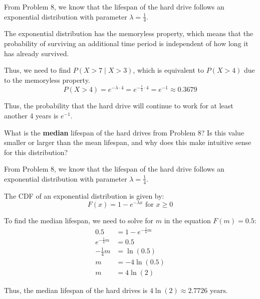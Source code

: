 \documentclass[a4paper, 10pt]{article}
\begin{document}
\begin{tosubmit}
	From Problem 8, we know that the lifespan of the hard drive follows an exponential distribution with parameter \( \lambda = \frac{1}{4} \).
	\par The exponential distribution has the memoryless property, which means that the probability of surviving an additional time period is independent of how long it has already survived.
	\par Thus, we need to find \( P(X > 7 \mid X > 3) \), which is equivalent to \( P(X > 4) \) due to the memoryless property.
	\[ P(X > 4) = e^{-\lambda \cdot 4} = e^{-\frac{1}{4} \cdot 4} = e^{-1} \approx 0.3679 \]

	Thus, the probability that the hard drive will continue to work for at least another 4 years is \( \boxed{e^{-1}} \).
\end{tosubmit}

\begin{problem}
What is the \textbf{median} lifespan of the hard drives from Problem 8?
Is this value smaller or larger than the mean lifespan, and why does this make intuitive sense for this distribution?
\end{problem}

\begin{solution}
	From Problem 8, we know that the lifespan of the hard drive follows an exponential distribution with parameter \( \lambda = \frac{1}{4} \).
	\par The CDF of an exponential distribution is given by:
	\[ F(x) = 1 - e^{-\lambda x} \text{ for } x \geq 0 \]

	To find the median lifespan, we need to solve for \( m \) in the equation \( F(m) = 0.5 \):
	\begin{align*}
		0.5                & = 1 - e^{-\frac{1}{4} m} \\
		e^{-\frac{1}{4} m} & = 0.5                    \\
		-\frac{1}{4} m     & = \ln(0.5)               \\
		m                  & = -4 \ln(0.5)            \\
		m                  & = 4 \ln(2)
	\end{align*}

	Thus, the median lifespan of the hard drives is \( \boxed{4 \ln(2) \approx 2.7726 \text{ years}} \).
\end{solution}
\end{document}
